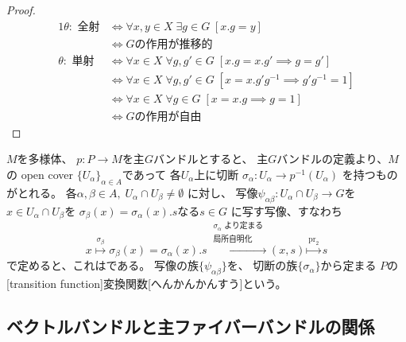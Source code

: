 \documentclass[report]{jlreq}
\begin{document}
\begin{proof}
    \begin{alignat}{1}
        \theta \colon \text{ 全射}
            &\iff \forall x, y \in X \; \exists g \in G \; [x.g = y] \\
            &\iff \text{$G$の作用が推移的} \\
        \theta \colon \text{ 単射}
            &\iff \forall x \in X \;
                \forall g, g' \in G \;
                [x.g = x.g' \implies g = g'] \\
            &\iff \forall x \in X \;
                \forall g, g' \in G \;
                [x = x.g'g^{-1} \implies g'g^{-1} = 1] \\
            &\iff \forall x \in X \;
                \forall g \in G \;
                [x = x.g \implies g = 1] \\
            &\iff \text{$G$の作用が自由}
    \end{alignat}
\end{proof}

\begin{definition}[変換関数]
    $M$を多様体、
    $p \colon P \to M$を主$G$バンドルとすると、
    主$G$バンドルの定義より、$M$の open cover $\{U_\alpha\}_{\alpha \in A}$であって
    各$U_\alpha$上に切断
    $\sigma_\alpha \colon U_\alpha \to p^{-1}(U_\alpha)$
    を持つものがとれる。
    各$\alpha, \beta \in A, \; U_\alpha \cap U_\beta \neq \emptyset$
    に対し、
    写像$\psi_{\alpha\beta} \colon U_\alpha \cap U_\beta \to G$を
    $x \in U_\alpha \cap U_\beta$を
    $\sigma_\beta(x) = \sigma_\alpha(x) . s$なる$s \in G$
    に写す写像、すなわち
    \begin{equation}
        x \overset{\sigma_\beta}{\mapsto} \sigma_\beta(x) = \sigma_\alpha(x) . s
            \overset{
                \substack{\sigma_\alpha \text{ より定まる} \\ \text{局所自明化}}
            }{\mapsto} (x, s)
            \overset{\mathrm{pr}_2}{\mapsto} s
    \end{equation}
    で定めると、これは{\smooth}である。
    {\smooth}写像の族$\{ \psi_{\alpha\beta} \}$を、
    切断の族$\{ \sigma_\alpha \}$から定まる
    $P$の[transition function]{変換関数}[へんかんかんすう]という。
\end{definition}

%
\subsection{ベクトルバンドルと主ファイバーバンドルの関係}
\end{document}
